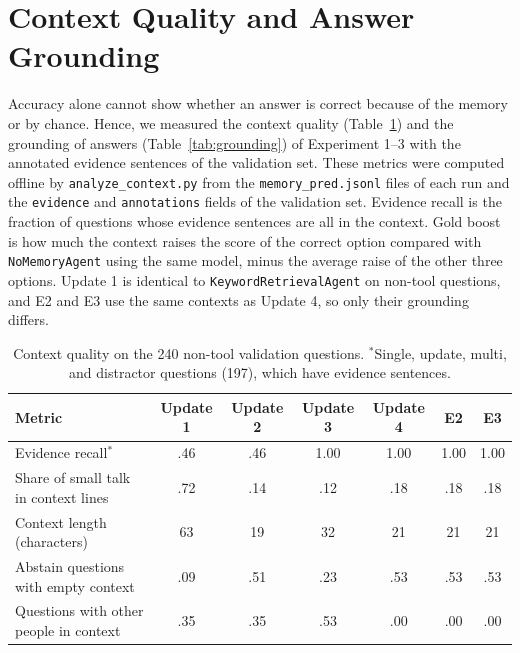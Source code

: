 \documentclass{article}
\begin{document}
\section{Context Quality and Answer Grounding}
\label{sec:grounding}
Accuracy alone cannot show whether an answer is correct because of the memory or by chance.
Hence, we measured the context quality (Table~\ref{tab:context}) and the grounding of answers (Table~\ref{tab:grounding}) of Experiment 1--3 with the annotated evidence sentences of the validation set.
These metrics were computed offline by \texttt{analyze\_context.py} from the \texttt{memory\_pred.jsonl} files of each run and the \texttt{evidence} and \texttt{annotations} fields of the validation set.
Evidence recall is the fraction of questions whose evidence sentences are all in the context.
Gold boost is how much the context raises the score of the correct option compared with \texttt{NoMemoryAgent} using the same model, minus the average raise of the other three options.
Update 1 is identical to \texttt{KeywordRetrievalAgent} on non-tool questions, and E2 and E3 use the same contexts as Update 4, so only their grounding differs.
\begin{table}[H]
    \centering
    \small
    \begin{tabular}{lcccccc}
        \toprule
        Metric & Update 1 & Update 2 & Update 3 & Update 4 & E2 & E3 \\
        \midrule
        Evidence recall$^{*}$ & .46 & .46 & 1.00 & 1.00 & 1.00 & 1.00 \\
        Share of small talk in context lines & .72 & .14 & .12 & .18 & .18 & .18 \\
        Context length (characters) & 63 & 19 & 32 & 21 & 21 & 21 \\
        Abstain questions with empty context & .09 & .51 & .23 & .53 & .53 & .53 \\
        Questions with other people in context & .35 & .35 & .53 & .00 & .00 & .00 \\
        \bottomrule
    \end{tabular}
    \caption{Context quality on the 240 non-tool validation questions. $^{*}$Single, update, multi, and distractor questions (197), which have evidence sentences.}
    \label{tab:context}
\end{table}
\end{document}
